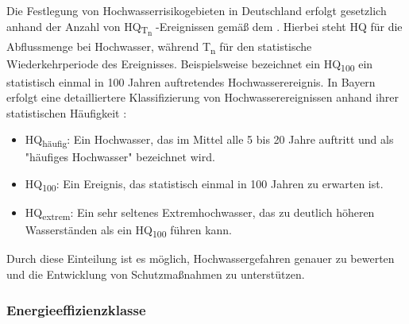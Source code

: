 Die Festlegung von Hochwasserrisikogebieten in Deutschland erfolgt gesetzlich anhand der Anzahl von HQ\textsubscript{T\textsubscript{n} }-Ereignissen gemäß dem \textcite{WHG73}. Hierbei steht HQ für die Abflussmenge bei Hochwasser, während T\textsubscript{n} für den statistische Wiederkehrperiode des Ereignisses. Beispielsweise bezeichnet ein HQ\textsubscript{100} ein statistisch einmal in 100 Jahren auftretendes Hochwasserereignis.
In Bayern erfolgt eine detailliertere Klassifizierung von Hochwasserereignissen anhand ihrer statistischen Häufigkeit \autocite{BayLfU2019}:
\begin{itemize}
\item HQ\textsubscript{häufig}: Ein Hochwasser, das im Mittel alle 5 bis 20 Jahre auftritt und als "häufiges Hochwasser" bezeichnet wird.
\item HQ\textsubscript{100}: Ein Ereignis, das statistisch einmal in 100 Jahren zu erwarten ist.
\item HQ\textsubscript{extrem}: Ein sehr seltenes Extremhochwasser, das zu deutlich höheren Wasserständen als ein HQ\textsubscript{100} führen kann.
\end{itemize}
Durch diese Einteilung ist es möglich, Hochwassergefahren genauer zu bewerten und die Entwicklung von Schutzmaßnahmen zu unterstützen.

\subsubsection{Energieeffizienzklasse}\label{sec:EPC}

